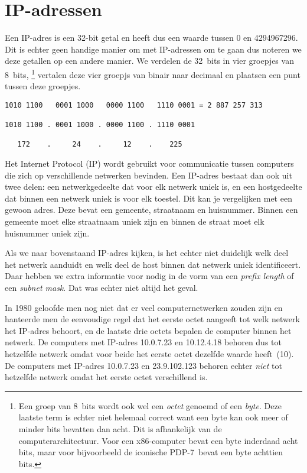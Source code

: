 \section{IP-adressen}

Een IP-adres is een 32-bit getal en heeft dus een waarde tussen 0 en \num{4294967296}.
Dit is echter geen handige manier om met IP-adressen om te gaan dus noteren we deze getallen op een andere manier.
We verdelen de 32~bits in vier groepjes van 8~bits,%
   \footnote{%
      Een groep van 8~bits wordt ook wel een \emph{octet} genoemd of een \emph{byte}.
      Deze laatste term is echter niet helemaal correct want een byte kan ook meer of minder bits bevatten dan acht.
      Dit is afhankelijk van de computerarchitectuur.
      Voor een x86-computer bevat een byte inderdaad acht bits, maar voor bijvoorbeeld de iconische PDP-7\footnotemark\ 
      bevat een byte achttien bits.
   }%
vertalen deze vier groepjs van binair naar decimaal en plaatsen een punt tussen deze groepjes.

\begin{verbatim}
1010 1100   0001 1000   0000 1100   1110 0001 = 2 887 257 313

1010 1100 . 0001 1000 . 0000 1100 . 1110 0001

   172    .     24    .     12    .    225
\end{verbatim}

Het Internet Protocol (IP) wordt gebruikt voor communicatie tussen computers die zich op verschillende netwerken bevinden.
Een IP-adres bestaat dan ook uit twee delen: een netwerkgedeelte dat voor elk netwerk uniek is, en een hostgedeelte dat binnen een netwerk uniek is voor elk toestel.
Dit kan je vergelijken met een gewoon adres.
Deze bevat een gemeente, straatnaam en huisnummer.
Binnen een gemeente moet elke straatnaam uniek zijn en binnen de straat moet elk huisnummer uniek zijn.

Als we naar bovenstaand IP-adres kijken, is het echter niet duidelijk welk deel het netwerk aanduidt en welk deel de host binnen dat netwerk uniek identificeert.
Daar hebben we extra informatie voor nodig in de vorm van een \emph{prefix length} of een \emph{subnet mask}.
Dat was echter niet altijd het geval.

In 1980 geloofde men nog niet dat er veel computernetwerken zouden zijn en hanteerde men de eenvoudige regel dat het eerste octet aangeeft tot welk netwerk het IP-adres behoort, en de laatste drie octets bepalen de computer binnen het netwerk.
De computers met IP-adres 10.0.7.23 en 10.12.4.18 behoren dus tot hetzelfde netwerk omdat voor beide het eerste octet dezelfde waarde heeft~(10).
De computers met IP-adres 10.0.7.23 en 23.9.102.123 behoren echter \emph{niet} tot hetzelfde netwerk omdat het eerste octet verschillend is.

